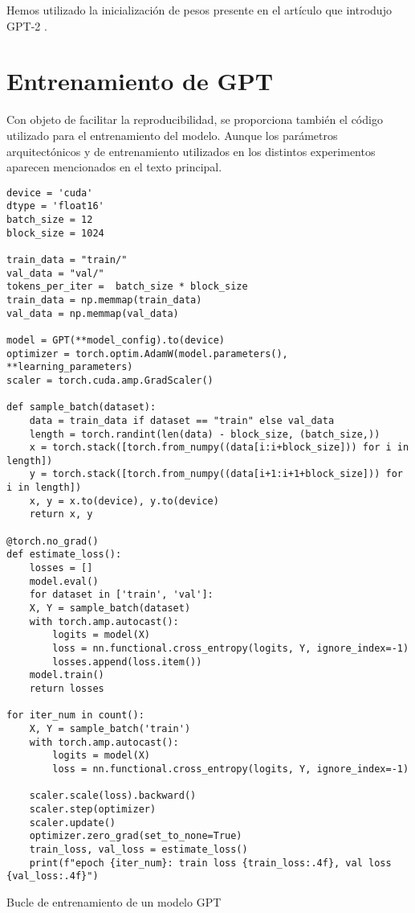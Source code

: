 Hemos utilizado la inicialización de pesos presente en el artículo que introdujo GPT-2 \cite{radford2019language}.

\section{Entrenamiento de GPT}
Con objeto de facilitar la reproducibilidad, se proporciona también el código utilizado para el entrenamiento del modelo. Aunque los parámetros arquitectónicos y de entrenamiento utilizados en los distintos experimentos aparecen mencionados en el texto principal.

\begin{code}
\begin{verbatim}  
device = 'cuda'
dtype = 'float16'
batch_size = 12
block_size = 1024

train_data = "train/"
val_data = "val/"
tokens_per_iter =  batch_size * block_size
train_data = np.memmap(train_data)
val_data = np.memmap(val_data)

model = GPT(**model_config).to(device)
optimizer = torch.optim.AdamW(model.parameters(), **learning_parameters)
scaler = torch.cuda.amp.GradScaler()

def sample_batch(dataset):
    data = train_data if dataset == "train" else val_data
    length = torch.randint(len(data) - block_size, (batch_size,))
    x = torch.stack([torch.from_numpy((data[i:i+block_size])) for i in length])
    y = torch.stack([torch.from_numpy((data[i+1:i+1+block_size])) for i in length])
    x, y = x.to(device), y.to(device)
    return x, y

@torch.no_grad()
def estimate_loss():
    losses = []
    model.eval()
    for dataset in ['train', 'val']:
    X, Y = sample_batch(dataset)
    with torch.amp.autocast():
        logits = model(X)
        loss = nn.functional.cross_entropy(logits, Y, ignore_index=-1)
        losses.append(loss.item())
    model.train()
    return losses

for iter_num in count():
    X, Y = sample_batch('train')
    with torch.amp.autocast():
        logits = model(X)
        loss = nn.functional.cross_entropy(logits, Y, ignore_index=-1)

    scaler.scale(loss).backward()
    scaler.step(optimizer)
    scaler.update()
    optimizer.zero_grad(set_to_none=True)
    train_loss, val_loss = estimate_loss()
    print(f"epoch {iter_num}: train loss {train_loss:.4f}, val loss {val_loss:.4f}")
\end{verbatim}
\caption{Bucle de entrenamiento de un modelo GPT}
\label{code:train_gpt}
\end{code}

